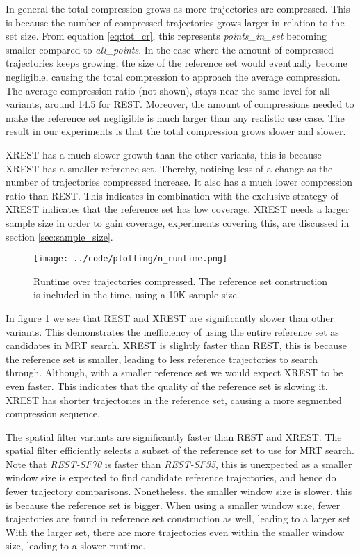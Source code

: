In general the total compression grows as more trajectories are compressed. This is because the number of compressed trajectories grows larger in relation to the set size. From equation \ref{eq:tot_cr}, this represents \textit{points\_in\_set} becoming smaller compared to \textit{all\_points}. In the case where the amount of compressed trajectories keeps growing, the size of the reference set would eventually become negligible, causing the total compression to approach the average compression. The average compression ratio (not shown), stays near the same level for all variants, around 14.5 for REST. Moreover, the amount of compressions needed to make the reference set negligible is much larger than any realistic use case. The result in our experiments is that the total compression grows slower and slower.

XREST has a much slower growth than the other variants, this is because XREST has a smaller reference set. Thereby, noticing less of a change as the number of trajectories compressed increase. It also has a much lower compression ratio than REST. This indicates in combination with the exclusive strategy of XREST indicates that the reference set has low coverage. XREST needs a larger sample size in order to gain coverage, experiments covering this, are discussed in section \ref{sec:sample_size}.

\begin{figure}[h]
    \begin{minipage}{0.99\linewidth}
        \centering
        \texttt{[image: ../code/plotting/n\_runtime.png]}
        \caption{Runtime over trajectories compressed. The reference set construction is included in the time, using a 10K sample size.}
        \label{fig:n_runtime}
    \end{minipage}
\end{figure}

In figure \ref{fig:n_runtime} we see that REST and XREST are significantly slower than other variants. This demonstrates the inefficiency of using the entire reference set as candidates in MRT search. XREST is slightly faster than REST, this is because the reference set is smaller, leading to less reference trajectories to search through. Although, with a smaller reference set we would expect XREST to be even faster. This indicates that the quality of the reference set is slowing it. XREST has shorter trajectories in the reference set, causing a more segmented compression sequence.

The spatial filter variants are significantly faster than REST and XREST. The spatial filter efficiently selects a subset of the reference set to use for MRT search. Note that \textit{REST-SF70} is faster than \textit{REST-SF35}, this is unexpected as a smaller window size is expected to find candidate reference trajectories, and hence do fewer trajectory comparisons. Nonetheless, the smaller window size is slower, this is because the reference set is bigger. When using a smaller window size, fewer trajectories are found in reference set construction as well, leading to a larger set. With the larger set, there are more trajectories even within the smaller window size, leading to a slower runtime.

